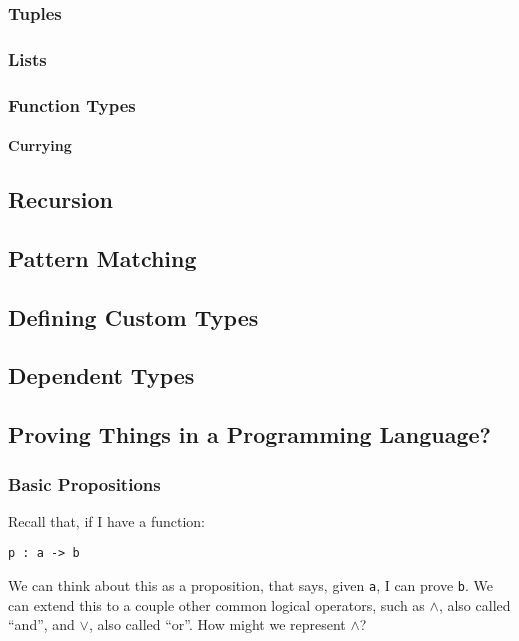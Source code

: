 \documentclass{article}
\newcommand{\inline}[1]{\texttt{#1}}
\begin{document}
\subsubsection{Tuples}

\subsubsection{Lists}

\subsubsection{Function Types}
\paragraph{Currying}

\subsection{Recursion}

\subsection{Pattern Matching}

\subsection{Defining Custom Types}

\subsection{Dependent Types}

\subsection{Proving Things in a Programming Language?}
\subsubsection{Basic Propositions}

Recall that, if I have a function:

\begin{verbatim}
p : a -> b
\end{verbatim}

We can think about this as a proposition, that says, given \inline{a}, I can prove \inline{b}.
We can extend this to a couple other common logical operators, such as $\wedge$, also called ``and'', and $\vee$, also called ``or''.
How might we represent $\wedge$?
\end{document}
